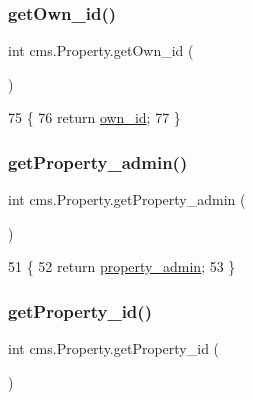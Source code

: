 \subsubsection{\texorpdfstring{get\+Own\+\_\+id()}{getOwn\_id()}}
{\footnotesize\ttfamily int cms.\+Property.\+get\+Own\+\_\+id (\begin{DoxyParamCaption}{ }\end{DoxyParamCaption})\hspace{0.3cm}{\ttfamily [inline]}}


\begin{DoxyCode}
75                            \{
76         \textcolor{keywordflow}{return} \mbox{\hyperlink{classcms_1_1_property_aa764bfa22c7dcc85bfdbc152dcf1a9f7}{own\_id}};
77     \}
\end{DoxyCode}
\mbox{\label{classcms_1_1_property_abfd65ea77f67d239dc1d7147421aceb9}} 
\subsubsection{\texorpdfstring{get\+Property\+\_\+admin()}{getProperty\_admin()}}
{\footnotesize\ttfamily int cms.\+Property.\+get\+Property\+\_\+admin (\begin{DoxyParamCaption}{ }\end{DoxyParamCaption})\hspace{0.3cm}{\ttfamily [inline]}}


\begin{DoxyCode}
51                                    \{
52         \textcolor{keywordflow}{return} \mbox{\hyperlink{classcms_1_1_property_a24082a4e64c157c5ef3b9238f58dba4c}{property\_admin}};
53     \}
\end{DoxyCode}
\mbox{\label{classcms_1_1_property_a8caddf6bd3a8062b52dff238a8697408}} 
\subsubsection{\texorpdfstring{get\+Property\+\_\+id()}{getProperty\_id()}}
{\footnotesize\ttfamily int cms.\+Property.\+get\+Property\+\_\+id (\begin{DoxyParamCaption}{ }\end{DoxyParamCaption})\hspace{0.3cm}{\ttfamily [inline]}}


